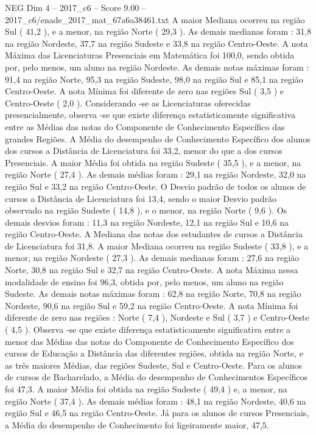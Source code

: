 \begin{textsample}{NEG Dim 4 – 2017\_c6 – Score 9.00 – 2017\_c6/enade\_2017\_mat\_67a6a38461.txt}
A maior Mediana ocorreu na região Sul ( 41,2 ), e a menor, na região Norte ( 29,3 ).
As demais medianas foram : 31,8 na região Nordeste, 37,7 na região Sudeste e 33,8 na região Centro-Oeste.
A nota Máxima das Licenciaturas Presenciais em Matemática foi 100,0, sendo obtida por, pelo menos, um aluno na região Nordeste.
As demais notas máximas foram : 91,4 na região Norte, 95,3 na região Sudeste, 98,0 na região Sul e 85,1 na região Centro-Oeste.
A nota Mínima foi diferente de zero nas regiões Sul ( 3,5 ) e Centro-Oeste ( 2,0 ).
Considerando -se as Licenciaturas oferecidas presencialmente, observa -se que existe diferença estatisticamente significativa entre as Médias das notas do Componente de Conhecimento Específico das grandes Regiões.
A Média do desempenho de Conhecimento Específico dos alunos dos cursos a Distância de Licenciatura foi 33,2, menor do que a dos cursos Presenciais.
A maior Média foi obtida na região Sudeste ( 35,5 ), e a menor, na região Norte ( 27,4 ).
As demais médias foram : 29,1 na região Nordeste, 32,0 na região Sul e 33,2 na região Centro-Oeste.
O Desvio padrão de todos os alunos de cursos a Distância de Licenciatura foi 13,4, sendo o maior Desvio padrão observado na região Sudeste ( 14,8 ), e o menor, na região Norte ( 9,6 ).
Os demais desvios foram : 11,3 na região Nordeste, 12,1 na região Sul e 10,6 na região Centro-Oeste.
A Mediana das notas dos estudantes de cursos a Distância de Licenciatura foi 31,8.
A maior Mediana ocorreu na região Sudeste ( 33,8 ), e a menor, na região Nordeste ( 27,3 ).
As demais medianas foram : 27,6 na região Norte, 30,8 na região Sul e 32,7 na região Centro-Oeste.
A nota Máxima nessa modalidade de ensino foi 96,3, obtida por, pelo menos, um aluno na região Sudeste.
As demais notas máximas foram : 62,8 na região Norte, 70,8 na região Nordeste, 90,6 na região Sul e 59,2 na região Centro-Oeste.
A nota Mínima foi diferente de zero nas regiões : Norte ( 7,4 ), Nordeste e Sul ( 3,7 ) e Centro-Oeste ( 4,5 ).
Observa -se que existe diferença estatisticamente significativa entre a menor das Médias das notas do Componente de Conhecimento Específico dos cursos de Educação a Distância das diferentes regiões, obtida na região Norte, e as três maiores Médias, das regiões Sudeste, Sul e Centro-Oeste.
Para os alunos de cursos de Bacharelado, a Média do desempenho de Conhecimentos Específicos foi 47,3.
A maior Média foi obtida na região Sudeste ( 49,4 ) e, a menor, na região Norte ( 37,4 ).
As demais médias foram : 48,1 na região Nordeste, 40,6 na região Sul e 46,5 na região Centro-Oeste.
Já para os alunos de cursos Presenciais, a Média do desempenho de Conhecimento foi ligeiramente maior, 47,5.

\end{textsample}
